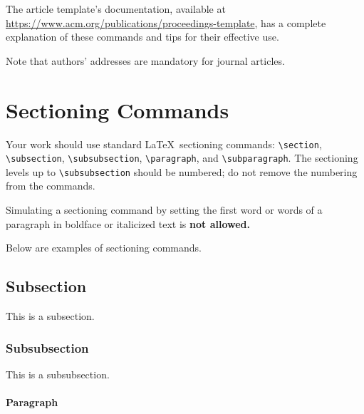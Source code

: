The article template's documentation, available at
\url{https://www.acm.org/publications/proceedings-template}, has a
complete explanation of these commands and tips for their effective
use.

Note that authors' addresses are mandatory for journal articles.


\section{Sectioning Commands}

Your work should use standard \LaTeX\ sectioning commands:
\verb|\section|, \verb|\subsection|, \verb|\subsubsection|,
\verb|\paragraph|, and \verb|\subparagraph|. The sectioning levels up to
\verb|\subsubsection| should be numbered; do not remove the numbering
from the commands.

Simulating a sectioning command by setting the first word or words of
a paragraph in boldface or italicized text is {\bfseries not allowed.}

Below are examples of sectioning commands.

\subsection{Subsection}
\label{sec:subsection}

This is a subsection.

\subsubsection{Subsubsection}
\label{sec:subsubsection}

This is a subsubsection.

\paragraph{Paragraph}

